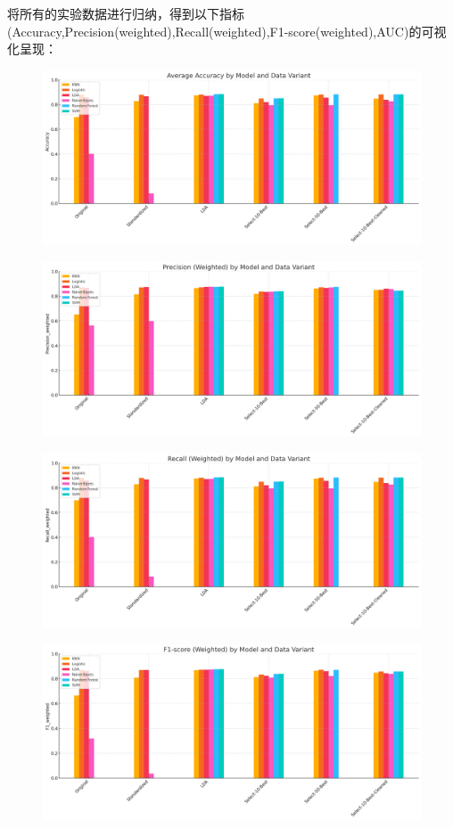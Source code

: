 \documentclass[10pt]{article}
\begin{document}
将所有的实验数据进行归纳，得到以下指标(Accuracy,Precision(weighted),Recall(weighted),F1-score(weighted),AUC)的可视化呈现：
\begin{figure}[H]
  \centering
  \includegraphics[width=0.8\linewidth]{cls_acc.png}
  \label{fig:10}
\end{figure}
\begin{figure}[H]
  \centering
  \includegraphics[width=0.8\linewidth]{cls_prec.png}
  \label{fig:11}
\end{figure}
\begin{figure}[H]
  \centering
  \includegraphics[width=0.8\linewidth]{cls_rec.png}
  \label{fig:12}
\end{figure}
\begin{figure}[H]
  \centering
  \includegraphics[width=0.8\linewidth]{cls_f1.png}
  \label{fig:14}
\end{figure}
\end{document}
